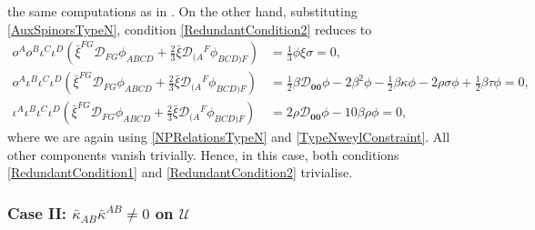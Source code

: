 \documentclass[10pt,a4paper]{article}
\newcommand\omicron{o}
\theoremstyle{plain}
\begin{document}
the same computations as in \cite{BaeVal10c}. On the other hand,
substituting \eqref{AuxSpinorsTypeN}, condition
\eqref{RedundantCondition2} reduces to
\begin{align*}
\omicron^A\omicron^B\iota^C\iota^D\left(\bar{\xi}^{FG}\mathcal{D}_{FG}\phi_{ABCD}
+
\tfrac{2}{3}\bar{\xi}\mathcal{D}_{(A}{}^F\phi_{BCD)F}\right)&=\tfrac{1}{3}\phi
\xi
\sigma=0,\\ \omicron^A\iota^B\iota^C\iota^D\left(\bar{\xi}^{FG}\mathcal{D}_{FG}\phi_{ABCD}
+ \tfrac{2}{3}\bar{\xi}\mathcal{D}_{(A}{}^F\phi_{BCD)F}\right)&=
\tfrac{1}{2} \beta \mathcal{D}_{\bm0\bm0}\phi-2 \beta^2 \phi -
\tfrac{1}{2} \beta \kappa \phi - 2 \rho \sigma \phi + \tfrac{1}{2}
\beta \tau \phi
=0,\\ \iota^A\iota^B\iota^C\iota^D\left(\bar{\xi}^{FG}\mathcal{D}_{FG}\phi_{ABCD}
+ \tfrac{2}{3}\bar{\xi}\mathcal{D}_{(A}{}^F\phi_{BCD)F}\right) &= 2
\rho \mathcal{D}_{\bm0\bm0}\phi-10 \beta \rho \phi =0,
\end{align*}
where we are again using \eqref{NPRelationsTypeN} and
\eqref{TypeNweylConstraint}. All other components vanish
trivially. Hence, in this case, both conditions
\eqref{RedundantCondition1} and \eqref{RedundantCondition2}
trivialise.


\subsubsection{Case II: $\bar{\kappa}_{AB}\bar{\kappa}^{AB}\neq 0$ on $\mathcal{U}$}\label{TypeDCase}
\end{document}
